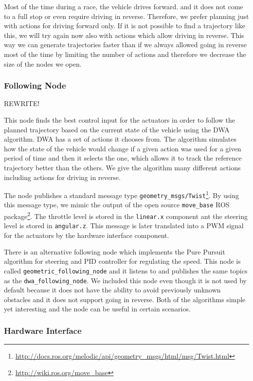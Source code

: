 Most of the time during a race, the vehicle drives forward. and it does not come to a full stop or even require driving in reverse. Therefore, we prefer planning just with actions for driving forward only. If it is not possible to find a trajectory like this, we will try again now also with actions which allow driving in reverse. This way we can generate trajectories faster than if we always allowed going in reverse most of the time by limiting the number of actions and therefore we decrease the size of the nodes we open.

\subsubsection{Following Node}

REWRITE!

This node finds the best control input for the actuators in order to follow the planned trajectory based on the current state of the vehicle using the \gls{DWA} algorithm. \gls*{DWA} has a set of actions it chooses from. The algorithm simulates how the state of the vehicle would change if a given action was used for a given period of time and then it selects the one, which allows it to track the reference trajectory better than the others. We give the algorithm many different actions including actions for driving in reverse.

The node publishes a standard message type \verb|geometry_msgs/Twist|\footnote{\url{http://docs.ros.org/melodic/api/geometry\_msgs/html/msg/Twist.html}}. By using this message type, we mimic the output of the open source \verb|move_base| \gls*{ROS} package\footnote{\url{http://wiki.ros.org/move\_base}}. The throttle level is stored in the \verb|linear.x| component ant the steering level is stored in \verb|angular.z|. This message is later translated into a \gls*{PWM} signal for the actuators by the hardware interface component.

There is an alternative following node which implements the Pure Pursuit algorithm for steering and \gls*{PID} controller for regulating the speed. This node is called \verb|geometric_following_node| and it listens to and publishes the same topics as the \verb|dwa_following_node|. We included this node even though it is not used by default because it does not have the ability to avoid previously unknown obstacles and it does not support going in reverse. Both of the algorithms simple yet interesting and the node can be useful in certain scenarios.

\subsubsection{Hardware Interface}
\label{sec:hardware-interface}

